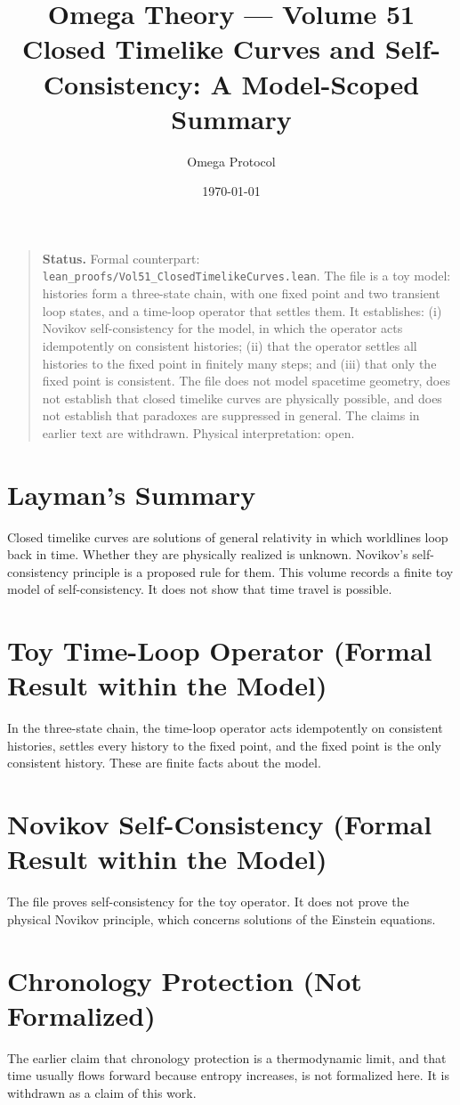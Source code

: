 \documentclass[11pt, a4paper]{article}
\title{Omega Theory --- Volume 51\\\Large Closed Timelike Curves and Self-Consistency: A Model-Scoped Summary}
\author{Omega Protocol}
\date{\today}
\begin{document}
\maketitle

\begin{quote}
\textbf{Status.} Formal counterpart: \texttt{lean\_proofs/Vol51\_ClosedTimelikeCurves.lean}. The file is a toy model: histories form a three-state chain, with one fixed point and two transient loop states, and a time-loop operator that settles them. It establishes: (i) Novikov self-consistency for the model, in which the operator acts idempotently on consistent histories; (ii) that the operator settles all histories to the fixed point in finitely many steps; and (iii) that only the fixed point is consistent. The file does not model spacetime geometry, does not establish that closed timelike curves are physically possible, and does not establish that paradoxes are suppressed in general. The claims in earlier text are withdrawn. Physical interpretation: open.
\end{quote}

\section*{Layman's Summary}
Closed timelike curves are solutions of general relativity in which worldlines loop back in time. Whether they are physically realized is unknown. Novikov's self-consistency principle is a proposed rule for them. This volume records a finite toy model of self-consistency. It does not show that time travel is possible.

\section{Toy Time-Loop Operator (Formal Result within the Model)}
In the three-state chain, the time-loop operator acts idempotently on consistent histories, settles every history to the fixed point, and the fixed point is the only consistent history. These are finite facts about the model.

\section{Novikov Self-Consistency (Formal Result within the Model)}
The file proves self-consistency for the toy operator. It does not prove the physical Novikov principle, which concerns solutions of the Einstein equations.

\section{Chronology Protection (Not Formalized)}
The earlier claim that chronology protection is a thermodynamic limit, and that time usually flows forward because entropy increases, is not formalized here. It is withdrawn as a claim of this work.
\end{document}
